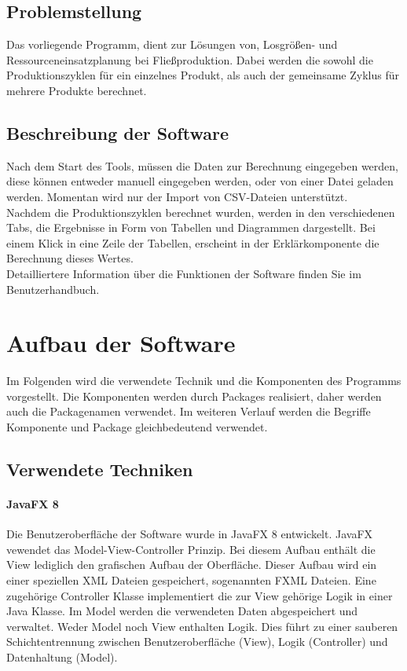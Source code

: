 \documentclass[12pt,a4paper, listof=entryprefix, bibliography=totocnumbered,toc=listofnumbered,lof=listofnumbered]{scrartcl}
\begin{document}
\subsection{Problemstellung}
Das vorliegende Programm, dient zur Lösungen von, Losgrößen- und Ressourceneinsatzplanung bei Fließproduktion. Dabei werden die sowohl die Produktionszyklen für ein einzelnes Produkt, als auch der gemeinsame Zyklus für mehrere Produkte berechnet.
\subsection{Beschreibung der Software}
Nach dem Start des Tools, müssen die Daten zur Berechnung eingegeben werden, diese können entweder manuell eingegeben werden, oder von einer Datei geladen werden. Momentan wird nur der Import von \gls{CSV}-Dateien unterstützt.
\\
Nachdem die Produktionszyklen berechnet wurden, werden in den verschiedenen Tabs, die Ergebnisse in Form von Tabellen und Diagrammen dargestellt. Bei einem Klick in eine Zeile der Tabellen, erscheint in der Erklärkomponente die Berechnung dieses Wertes.
\\
Detailliertere Information über die Funktionen der Software finden Sie im Benutzerhandbuch.



\section{Aufbau der Software}
Im Folgenden wird die verwendete Technik und die Komponenten des Programms vorgestellt. Die Komponenten werden durch Packages realisiert, daher werden auch die Packagenamen verwendet. Im weiteren Verlauf werden die Begriffe Komponente und Package gleichbedeutend verwendet.

\subsection{Verwendete Techniken}
\paragraph{JavaFX 8}
Die Benutzeroberfläche der Software wurde in JavaFX 8 entwickelt. JavaFX vewendet das Model-View-Controller Prinzip. Bei diesem Aufbau enthält die View lediglich den grafischen Aufbau der Oberfläche. Dieser Aufbau wird ein einer speziellen \gls{XML} Dateien gespeichert, sogenannten FXML Dateien. Eine zugehörige Controller Klasse implementiert die zur View gehörige Logik in einer Java Klasse. Im Model werden die verwendeten Daten abgespeichert und verwaltet. Weder Model noch View enthalten Logik. Dies führt zu einer sauberen Schichtentrennung zwischen Benutzeroberfläche (View), Logik (Controller) und Datenhaltung (Model).
\end{document}
